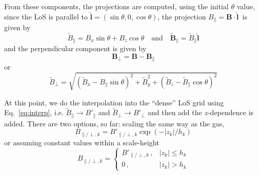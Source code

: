 \documentclass[a4paper,10pt]{article}
\renewcommand{\vec}{\bm} %
\begin{document}
From these components, the projections are computed, using the initial $\theta$ value,
since the LoS is parallel to $\vec {\hat l} = (\sin\theta, 0, \cos\theta)$, the projection
$B_\parallel = \vec B \cdot \vec{\hat l}\,$ is given by
\begin{equation}
    \widetilde  B_\parallel = B_x \sin\theta + B_z \cos\theta
    \quad \text{and}\quad
    \widetilde {\vec B}_\parallel = \widetilde B_\parallel \vec {\hat l}
\end{equation}
and the perpendicular component is given by
\begin{equation}
    \vec B_\perp = \vec B -\vec B_\parallel
\end{equation}
or
\begin{equation}
 \widetilde B_\perp = \sqrt{ (\widetilde B_x - B_\parallel\sin\theta)^2 +
                 \widetilde B_y^2 +
                 (\widetilde B_z -\widetilde B_\parallel\cos\theta)^2}
\end{equation}

At this point, we do the interpolation into the ``dense'' LoS grid using Eq.~\ref{eq:interp},
i.e. $\widetilde B_\parallel \rightarrow B'_\parallel$ and
 $\widetilde B_\perp \rightarrow B'_\perp$ and then add the $z$-dependence is added.
 There are two options, so far: scaling the same way as the gas,
\begin{equation}
    B_{\parallel/\perp, k} = B'_{\parallel/\perp, k} \exp(-|z_k|/h_k)
\end{equation}
or assuming constant values within a scale-height
\begin{equation}
    B_{{\parallel/\perp},k} = \begin{cases}
                    B'_{{\parallel/\perp},k}\,, & |z_k| \leq h_k\\
                      0\,,          & |z_k| >    h_k
                  \end{cases}
\end{equation}
\end{document}
